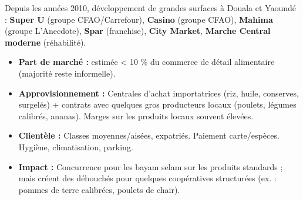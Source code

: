 \documentclass[11pt]{article}
\begin{document}
\begin{propriete}
Depuis les années 2010, développement de grandes surfaces à Douala et Yaoundé : \textbf{Super U} (groupe CFAO/Carrefour), \textbf{Casino} (groupe CFAO), \textbf{Mahima} (groupe L'Anecdote), \textbf{Spar} (franchise), \textbf{City Market}, \textbf{Marche Central moderne} (réhabilité).
\begin{itemize}
\item \textbf{Part de marché :} estimée < 10 \% du commerce de détail alimentaire (majorité reste informelle).
\item \textbf{Approvisionnement :} Centrales d'achat importatrices (riz, huile, conserves, surgelés) + contrats avec quelques gros producteurs locaux (poulets, légumes calibrés, ananas). Marges sur les produits locaux souvent élevées.
\item \textbf{Clientèle :} Classes moyennes/aisées, expatriés. Paiement carte/espèces. Hygiène, climatisation, parking.
\item \textbf{Impact :} Concurrence pour les bayam selam sur les produits standards ; mais créent des débouchés pour quelques coopératives structurées (ex. : pommes de terre calibrées, poulets de chair).
\end{itemize}
\end{propriete}
\end{document}
